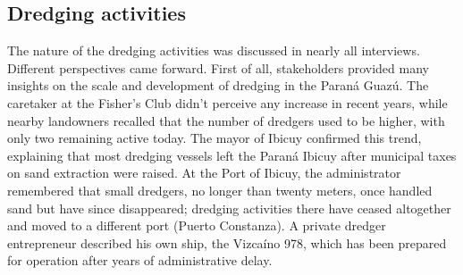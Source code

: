 


\subsection{Dredging activities}
\label{subsec:dredging activities interviews}
The nature of the dredging activities was discussed in nearly all interviews. Different perspectives came forward. First of all, stakeholders provided many insights on the scale and development of dredging in the Paraná Guazú. The caretaker at the Fisher’s Club didn't perceive any increase in recent years, while nearby landowners recalled that the number of dredgers used to be higher, with only two remaining active today. The mayor of Ibicuy confirmed this trend, explaining that most dredging vessels left the Paraná Ibicuy after municipal taxes on sand extraction were raised. At the Port of Ibicuy, the administrator remembered that small dredgers, no longer than twenty meters, once handled sand but have since disappeared; dredging activities there have ceased altogether and moved to a different port (Puerto Constanza). A private dredger entrepreneur described his own ship, the Vizcaíno 978, which has been prepared for operation after years of administrative delay.

